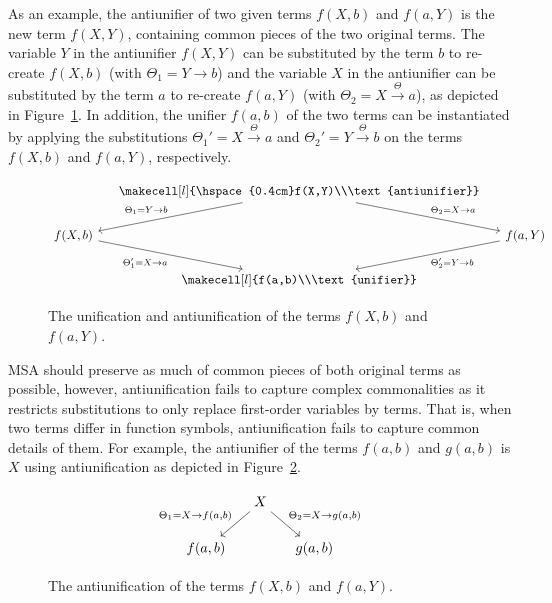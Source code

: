 As an example, the antiunifier of two given terms $f(X,b)$ and $f(a,Y)$ is the new term $f(X,Y)$, containing common pieces of the two original terms. The variable $Y$ in the antiunifier $f(X,Y)$ can be substituted by the term $b$ to re-create $f(X,b)$ (with $\Theta_1 = Y\xrightarrow{}b$) and the variable $X$ in the antiunifier can be substituted by the term $a$ to re-create $f(a,Y)$
(with $\Theta_2 = X\xrightarrow{\Theta}a$), as depicted in Figure~\ref{fig:uni-anti-uni}.
In addition, the unifier $f(a,b)$ of the two terms can be instantiated by applying the substitutions $\Theta_1'=X\xrightarrow{\Theta}a$ and $\Theta_2'=Y\xrightarrow{\Theta}b$ on the terms $f(X,b)$ and $f(a,Y)$, respectively.

\begin{figure} [H]
  \[
\begin{tikzcd}[column sep=small]
&
  {\makecell[l]{\hspace{0.4cm}f(X,Y)\\\text{antiunifier}}}
  \arrow{dr}{\Theta_2 = X \rightarrow a}
  \arrow[->,swap]{dl}{\Theta_1 = Y \rightarrow b} %
\\
f(X,b)
 \arrow[->,swap]{dr}{\Theta_1' = X \rightarrow a}
&&
f(a, Y)
  \arrow{dl}{\Theta_2' = Y \rightarrow b}
  \\
&
{\makecell[l]{f(a,b)\\\text{unifier}}}
\end{tikzcd}
\]
  \caption{The unification and antiunification of the terms $f(X,b)$ and $f(a,Y)$.}
  \label{fig:uni-anti-uni}
\end{figure}

MSA should preserve as much of common pieces of both original terms as possible, however, antiunification fails to capture complex commonalities as it restricts substitutions to only replace first-order variables by terms. That is, when two terms differ in function symbols, antiunification fails to capture common details of them. For example, the antiunifier of the terms $f(a,b)$ and $g(a,b)$ is $X$ using antiunification as depicted in Figure~\ref{fig:first-anti-uni}.

\begin{figure} [H]
\[
\begin{tikzcd}[column sep=small]
&
  X
  \arrow{dr}{\Theta_2 = X \rightarrow g(a,b)}
  \arrow[->,swap]{dl}{\Theta_1 = X \rightarrow f(a,b)} %
\\
f(a,b)
&&
g(a,b)
\end{tikzcd}
\]
  \caption{The antiunification of the terms $f(X,b)$ and $f(a,Y)$.}
  \label{fig:first-anti-uni}
\end{figure}

